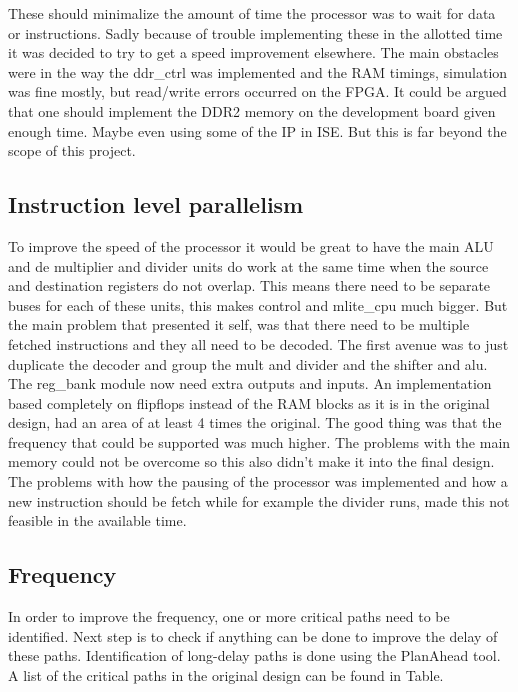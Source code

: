 \documentclass[final]{article}
\begin{document}
These should minimalize the amount of time the processor was to wait for data or instructions.
Sadly because of trouble implementing these in the allotted time it was decided to try to get a speed improvement elsewhere.
The main obstacles were in the way the ddr\_ctrl was implemented and the RAM timings, simulation was fine mostly, but read/write errors occurred on the FPGA.
It could be argued that one should implement the DDR2 memory on the development board given enough time.
Maybe even using some of the IP in ISE.
But this is far beyond the scope of this project.

\subsection{Instruction level parallelism}
To improve the speed of the processor it would be great to have the main ALU and de multiplier and divider units do work at the same time when the source and destination registers do not overlap.
This means there need to be separate buses for each of these units, this makes control and mlite\_cpu much bigger.
But the main problem that presented it self, was that there need to be multiple fetched instructions and they all need to be decoded.
The first avenue was to just duplicate the decoder and group the mult and divider and the shifter and alu.
The reg\_bank module now need extra outputs and inputs.
An implementation based completely on flipflops instead of the RAM blocks as it is in the original design, had an area of at least 4 times the original.
The good thing was that the frequency that could be supported was much higher.
The problems with the main memory could not be overcome so this also didn't make it into the final design.
The problems with how the pausing of the processor was implemented and how a new instruction should be fetch while for example the divider runs, made this not feasible in the available time.

\subsection{Frequency}
In order to improve the frequency, one or more critical paths need to be identified. Next step is to check if anything can be done to improve the delay of these paths. Identification of long-delay paths is done using the PlanAhead tool. A list of the critical paths in the original design can be found in Table.
\end{document}
